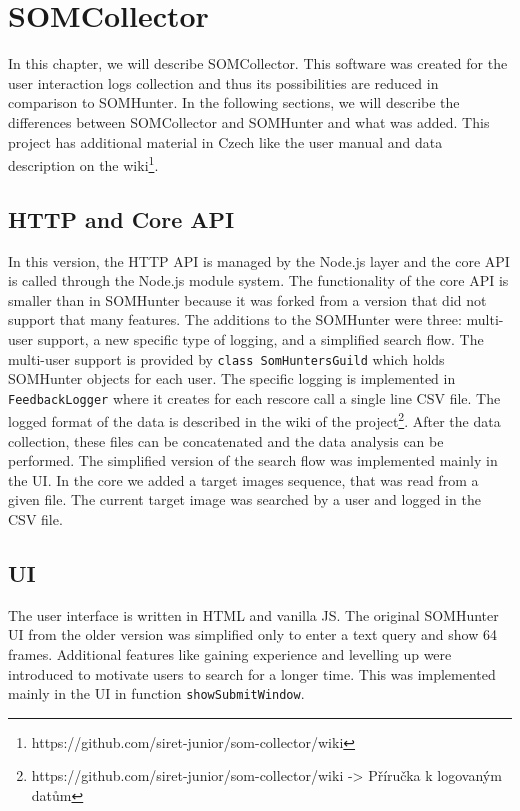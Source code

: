 \chapter{SOMCollector}
\label{somcollector}

In this chapter, we will describe SOMCollector. This software was created for the user interaction logs collection and thus its possibilities are reduced in comparison to SOMHunter. In the following sections, we will describe the differences between SOMCollector and SOMHunter and what was added. This project has additional material in Czech like the user manual and data description on the wiki\footnote{https://github.com/siret-junior/som-collector/wiki}. 

\section{HTTP and Core API}
In this version, the HTTP API is managed by the Node.js layer and the core API is called through the Node.js module system. The functionality of the core API is smaller than in SOMHunter because it was forked from a version that did not support that many features. The additions to the SOMHunter were three: multi-user support, a new specific type of logging, and a simplified search flow. The multi-user support is provided by \lstinline{class SomHuntersGuild} which holds SOMHunter objects for each user. The specific logging is implemented in \lstinline{FeedbackLogger} where it creates for each rescore call a single line CSV file. The logged format of the data is described in the wiki of the project\footnote{https://github.com/siret-junior/som-collector/wiki -> Příručka k logovaným datům}. After the data collection, these files can be concatenated and the data analysis can be performed. The simplified version of the search flow was implemented mainly in the UI. In the core we added a target images sequence, that was read from a given file. The current target image was searched by a user and logged in the CSV file.

\section{UI}

The user interface is written in HTML and vanilla JS. The original SOMHunter UI from the older version was simplified only to enter a text query and show 64 frames. Additional features like gaining experience and levelling up were introduced to motivate users to search for a longer time. This was implemented mainly in the UI in function \lstinline{showSubmitWindow}.
